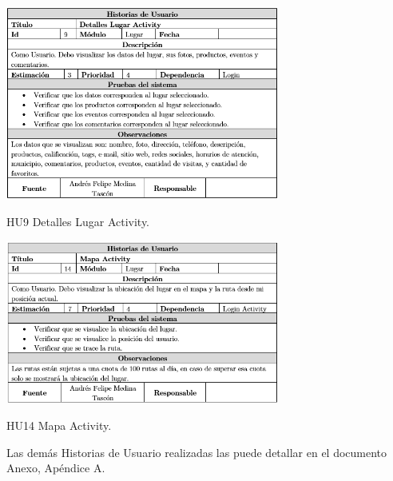 \documentclass[12pt,letterpaper,openany]{book}
\begin{document}
\begin{table}[H]
\centering
\includegraphics[width=9cm]{./imagenes/HU/HU9}
\caption{HU9 Detalles Lugar Activity.}
\end{table}

\begin{table}[H]
\centering
\includegraphics[width=9cm]{./imagenes/HU/HU14}
\caption{HU14 Mapa Activity.}
\end{table}

Las demás Historias de Usuario realizadas las puede detallar en el documento Anexo, Apéndice A.
\end{document}
